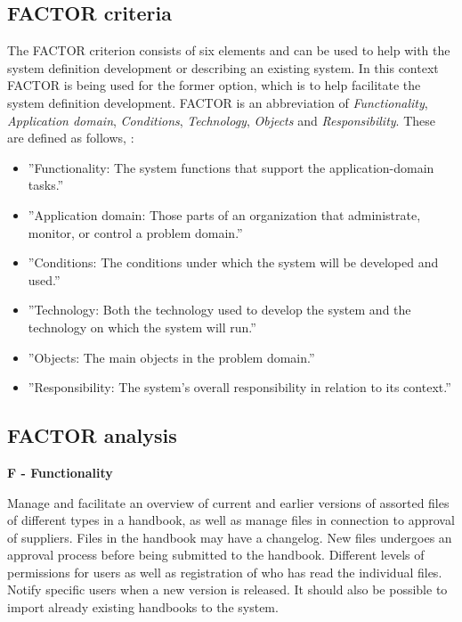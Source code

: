 \subsection{FACTOR criteria} \label{sec:factorcriteria}
The FACTOR criterion consists of six elements and can be used to help with the system definition development or describing an existing system.
In this context FACTOR is being used for the former option, which is to help facilitate the system definition development.
FACTOR is an abbreviation of \textit{Functionality}, \textit{Application domain}, \textit{Conditions}, \textit{Technology}, \textit{Objects} and \textit{Responsibility}.
These are defined as follows, \citep[p.~40]{Rod-Aalborg}:
\begin{itemize}
	\item
		''Functionality:
		The system functions that support the application-domain tasks.''
	\item
		''Application domain:
		Those parts of an organization that administrate, monitor, or control a problem domain.''
	\item
		''Conditions:
		The conditions under which the system will be developed and used.''
	\item
		''Technology:
		Both the technology used to develop the system and the technology on which the system will run.''
	\item
		''Objects:
		The main objects in the problem domain.''
	\item
		''Responsibility:
		The system’s overall responsibility in relation to its context.''
\end{itemize}

\subsection{FACTOR analysis}\label{factor}

\noindent\textbf{F - Functionality}

Manage and facilitate an overview of current and earlier versions of assorted files of different types in a handbook, as well as manage files in connection to approval of suppliers.
Files in the handbook may have a changelog.
New files undergoes an approval process before being submitted to the handbook.
Different levels of permissions for users as well as registration of who has read the individual files.
Notify specific users when a new version is released.
It should also be possible to import already existing handbooks to the system.


